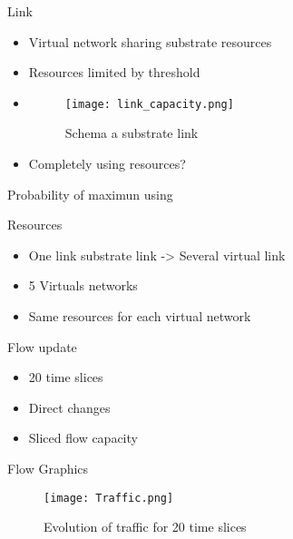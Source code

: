 \documentclass{beamer}
\begin{document}
\begin{frame}{Link}
  \begin{itemize}
  \item Virtual network sharing substrate resources
  \item Resources limited by threshold
  \item{
    \begin{figure}
      \texttt{[image: link\_capacity.png]}
      \caption{Schema a substrate link}
    \end{figure}
  }
  \item Completely using resources?
  \end{itemize}
\end{frame}


\begin{frame}{Probability of maximun using}
  \begin{block}{Resources}
    \begin{itemize}
    \item{One link substrate link -> Several virtual link}
    \item{5 Virtuals networks}
    \item{Same resources for each virtual network}
    \end{itemize}
  \end{block}
  \begin{block}{Flow update}
    \begin{itemize}
    \item{20 time slices}
    \item{Direct changes}
    \item{Sliced flow capacity}
    \end{itemize}
  \end{block}
\end{frame}


\begin{frame}{Flow Graphics}
  \begin{figure}
    \texttt{[image: Traffic.png]}
    \caption{Evolution of traffic for 20 time slices}
  \end{figure}
\end{frame} 
\end{document}
